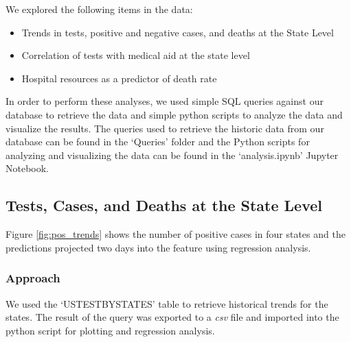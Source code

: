 \documentclass[11pt]{article}
\begin{document}
\noindent
We explored the following items in the data:
\begin{itemize}
    \item Trends in tests, positive and negative cases, and deaths at the State Level
    \item Correlation of tests with medical aid at the state level
    \item Hospital resources as a predictor of death rate
\end{itemize}
In order to perform these analyses, we used simple SQL queries against our database to retrieve the data and simple python scripts to analyze the data and visualize the results. The queries used to retrieve the historic data from our database can be found in the `Queries' folder and the Python scripts for analyzing and visualizing the data can be found in the `analysis.ipynb' Jupyter Notebook.

\pagebreak

\subsection{Tests, Cases, and Deaths at the State Level}
\label{subsec:StateLevel}

\noindent
Figure \ref{fig:pos_trends} shows the number of positive cases in four states and the predictions projected two days into the feature using regression analysis.
\subsubsection{Approach}
We used the `USTESTBYSTATES' table to retrieve historical trends for the states. The result of the query was exported to a \textit{csv} file and imported into the python script for plotting and regression analysis.
\end{document}
